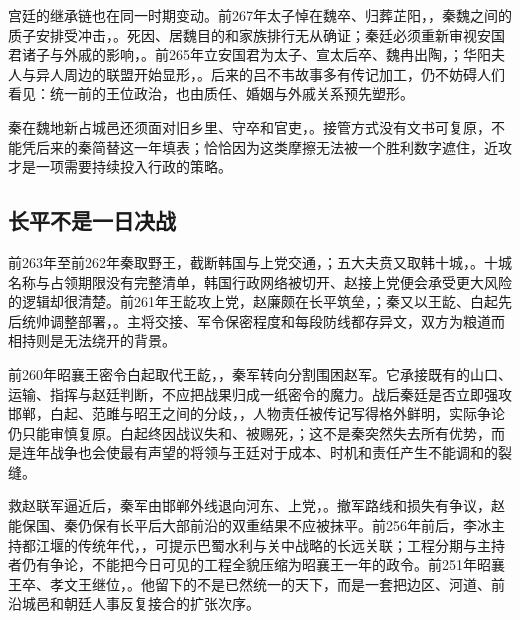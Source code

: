 宫廷的继承链也在同一时期变动。前267年太子悼在魏卒、归葬芷阳，，秦魏之间的质子安排受冲击，。死因、居魏目的和家族排行无从确证；秦廷必须重新审视安国君诸子与外戚的影响，。前265年立安国君为太子、宣太后卒、魏冉出陶，；华阳夫人与异人周边的联盟开始显形，。后来的吕不韦故事多有传记加工，仍不妨碍人们看见：统一前的王位政治，也由质任、婚姻与外戚关系预先塑形。

秦在魏地新占城邑还须面对旧乡里、守卒和官吏，。接管方式没有文书可复原，不能凭后来的秦简替这一年填表；恰恰因为这类摩擦无法被一个胜利数字遮住，近攻才是一项需要持续投入行政的策略。

\subsection{长平不是一日决战}

前263年至前262年秦取野王，截断韩国与上党交通，；五大夫贲又取韩十城，。十城名称与占领期限没有完整清单，韩国行政网络被切开、赵接上党便会承受更大风险的逻辑却很清楚。前261年王龁攻上党，赵廉颇在长平筑垒，；秦又以王龁、白起先后统帅调整部署，。主将交接、军令保密程度和每段防线都存异文，双方为粮道而相持则是无法绕开的背景。

前260年昭襄王密令白起取代王龁，，秦军转向分割围困赵军。它承接既有的山口、运输、指挥与赵廷判断，不应把战果归成一纸密令的魔力。战后秦廷是否立即强攻邯郸，白起、范雎与昭王之间的分歧，，人物责任被传记写得格外鲜明，实际争论仍只能审慎复原。白起终因战议失和、被赐死，；这不是秦突然失去所有优势，而是连年战争也会使最有声望的将领与王廷对于成本、时机和责任产生不能调和的裂缝。

救赵联军逼近后，秦军由邯郸外线退向河东、上党，。撤军路线和损失有争议，赵能保国、秦仍保有长平后大部前沿的双重结果不应被抹平。前256年前后，李冰主持都江堰的传统年代，，可提示巴蜀水利与关中战略的长远关联；工程分期与主持者仍有争论，不能把今日可见的工程全貌压缩为昭襄王一年的政令。前251年昭襄王卒、孝文王继位，。他留下的不是已然统一的天下，而是一套把边区、河道、前沿城邑和朝廷人事反复接合的扩张次序。

